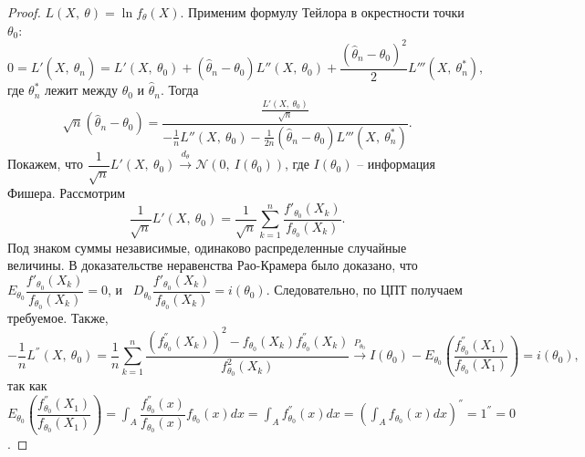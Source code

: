 \begin{proof}
    $\displaystyle L( X,\ \theta ) =\ln f_\theta(X)$. Применим формулу Тейлора в окрестности точки $\displaystyle \theta _{0}$:
    \begin{equation*}
        0=L'( X,\ \hat{\theta }_{n}) =L'( X,\ \theta _{0}) +(\hat{\theta }_{n} -\theta _{0}) L''( X,\ \theta_0) +\dfrac{(\hat{\theta }_{n} -\theta _{0})^{2}}{2} L'''\left( X,\ \theta _{n}^{*}\right) ,
    \end{equation*}
    где $\displaystyle \theta _{n}^{*}$ лежит между $\displaystyle \theta _{0}$ и $\displaystyle \hat{\theta }_{n}$. Тогда 
    \begin{equation*}
        \sqrt{n}(\hat{\theta }_{n} -\theta _{0}) =\dfrac{\frac{L'( X,\ \theta _{0})}{\sqrt{n}}}{-\frac{1}{n} L''( X,\ \theta _{0}) -\frac{1}{2n}(\hat{\theta }_{n} -\theta _{0}) L'''\left( X,\ \theta _{n}^{*}\right)} .
    \end{equation*}
    Покажем, что $\displaystyle \dfrac{1}{\sqrt{n}} L'( X,\ \theta _{0})\xrightarrow{d_{\theta }}\mathcal{N}( 0,\ I( \theta _{0}))$, где $\displaystyle I( \theta _{0})$ -- информация Фишера. Рассмотрим
    \begin{equation*}
        \dfrac{1}{\sqrt{n}} L'( X,\ \theta _{0}) =\dfrac{1}{\sqrt{n}}\sum _{k=1}^{n}\dfrac{f'_{\theta _{0}}( X_{k})}{f_{\theta _{0}}( X_{k})} .
    \end{equation*}
    Под знаком суммы независимые, одинаково распределенные случайные величины. В доказательстве неравенства Рао-Крамера было доказано, что $\displaystyle E_{\theta _{0}}\dfrac{f'_{\theta _{0}}( X_{k})}{f_{\theta _{0}}( X_{k})} =0$, и \ $\displaystyle D_{\theta _{0}}\dfrac{f'_{\theta _{0}}( X_{k})}{f_{\theta _{0}}( X_{k})} =i( \theta _{0})$. Следовательно, по ЦПТ получаем требуемое.
    Также,
    \begin{equation*}
        -\dfrac{1}{n} L^{''}( X,\ \theta _{0}) =\dfrac{1}{n}\sum _{k=1}^{n}\dfrac{\left( f_{\theta _{0}}^{''}( X_{k})\right)^{2} -f_{\theta _{0}}( X_{k}) f_{\theta _{0}}^{''}( X_{k})}{f_{\theta _{0}}^{2}( X_{k})}\xrightarrow{P_{\theta _{0}}} I( \theta _{0}) -E_{\theta _{0}}\left(\dfrac{f_{\theta _{0}}^{''}( X_{1})}{f_{\theta _{0}}( X_{1})}\right) =i( \theta _{0}) ,
    \end{equation*}
    так как $\displaystyle E_{\theta _{0}}\left(\dfrac{f_{\theta _{0}}^{''}( X_{1})}{f_{\theta _{0}}( X_{1})}\right) =\int _{A}\dfrac{f_{\theta _{0}}^{''}( x)}{f_{\theta _{0}}( x)} f_{\theta _{0}}( x) dx=\int _{A} f_{\theta _{0}}^{''}( x) dx=\left(\int _{A} f_{\theta _{0}}( x)dx\right)^{''} =1^{''} =0$.
    

\end{proof}
